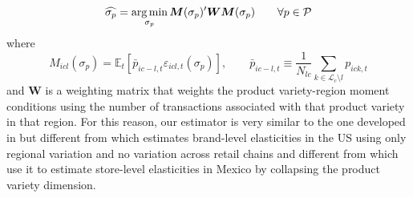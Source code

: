 {\begin{equation*}
    \widehat{\sigma_p} = \operatorname*{arg\,min}_{\sigma_p} \boldsymbol{M}(\sigma_p)'\boldsymbol{W}\boldsymbol{M}(\sigma_p) \qquad \forall p \in \mathcal{P} 
\end{equation*}
where 
\begin{equation*}
    M_{icl}(\sigma_p) = \mathbb{E}_{t}\left[\bar{p}_{ic-l,t}\varepsilon_{icl,t}(\sigma_p)\right], \qquad 
    \bar{p}_{ic-l,t} \equiv \frac{1}{N_{lc}} \sum_{k \in \mathcal{L}_c\setminus l} p_{ick,t}  
\end{equation*}
and $\boldsymbol{W}$ is a weighting matrix that weights the product variety-region moment conditions using the number of transactions associated with that product variety in that region. For this reason, our estimator is very similar to the one developed in \citet{Dellavigna2019} but different from \citet{Faber2021} which estimates brand-level elasticities in the US using only regional variation and no variation across retail chains and different from \citet{Atkin2018} which use it to estimate store-level elasticities in Mexico by collapsing the product variety dimension.}

